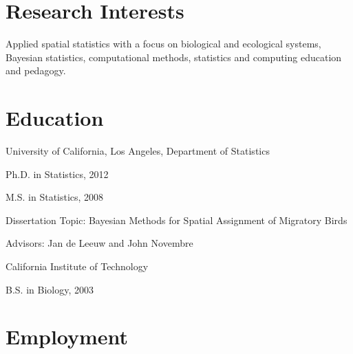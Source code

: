 \documentclass[margin,line]{res}
\begin{document}
\address{
204 Old Chemistry Building $\bullet$ Dept of Statistical Science, Duke University  
}

\begin{resume}

%

\vspace{3mm}

\section{\sc Research Interests}
Applied spatial statistics with a focus on biological and ecological systems, Bayesian statistics, computational methods, statistics and computing education and pedagogy.

\vspace{4mm}

%

\section{\sc Education}
University of California, Los Angeles, Department of Statistics
\vspace{1mm}
\begin{list1}
\item[] Ph.D. in Statistics,  2012
\item[] M.S. in Statistics,  2008
\vspace{1mm}
\item[] Dissertation Topic:  Bayesian Methods for Spatial Assignment of Migratory Birds
\item[] Advisors:  Jan de Leeuw and John Novembre
\end{list1}

\vspace{-0.13cm}
California Institute of Technology
\vspace{1mm}
\begin{list1}
\item[] B.S. in Biology, 2003
\end{list1}

\vspace{3mm}

%

\section{\sc Employment}


\end{resume}
\end{document}
